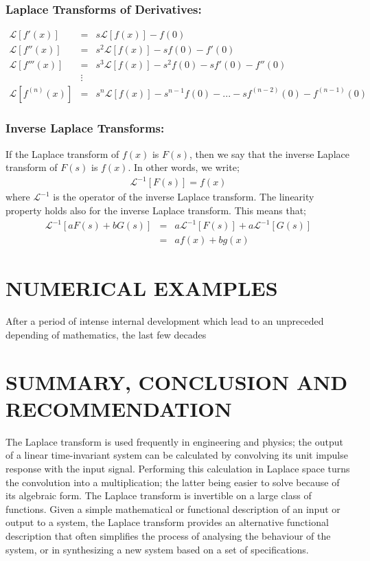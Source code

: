 \documentclass[11pt]{report}
\newcommand{\sps}{\\[0.2cm]}
\begin{document}
	\subsection{Laplace Transforms of Derivatives:}
	\begin{eqnarray*}
		\mathcal{L}[f'(x)] &=& s \mathcal{L}[f(x)] - f(0)\sps
		\mathcal{L}[f''(x)] &=& s^2 \mathcal{L}[f(x)] - sf(0) - f'(0)\sps
		\mathcal{L}[f'''(x)] &=& s^3 \mathcal{L}[f(x)] - s^2f(0) - sf'(0) - f''(0)\sps
		&\vdots\sps
		\mathcal{L}[f^{(n)} (x)] &=& s^n \mathcal{L}[f(x)] - s^{n - 1} f(0) -... - sf^{(n - 2)}(0) - f^{(n - 1)}(0)
	\end{eqnarray*}

	\subsection{Inverse Laplace Transforms:}
	If the Laplace transform of $f(x)$ is $F(s)$, then we say that the inverse Laplace transform of $F(s)$ is $f(x)$. In other words, we write;
	\begin{eqnarray}
		\mathcal{L}^{-1}[F(s)] = f(x)
	\end{eqnarray}
	where $\mathcal{L}^{-1}$ is the operator of the inverse Laplace transform. The linearity property holds also for the inverse Laplace transform. This means that;
	\begin{eqnarray*}
		\mathcal{L}^{-1}[aF(s) + bG(s)] &=& a \mathcal{L}^{-1}[F(s)] +  a \mathcal{L}^{-1}[G(s)]\sps
		&=& af(x) + bg(x)
	\end{eqnarray*}


	\chapter{NUMERICAL EXAMPLES}

	After a period of intense internal development which lead to an unpreceded depending of mathematics, the last few decades 

	\chapter{SUMMARY, CONCLUSION AND RECOMMENDATION}
	The Laplace transform is used frequently in engineering and physics; the output of a linear time-invariant system can be calculated by convolving its unit impulse response with the input signal. Performing this calculation in Laplace space turns the convolution into a multiplication; the latter being easier to solve because of its algebraic form. The Laplace transform is invertible on a large class of functions. Given a simple mathematical or functional description of an input or output to a system, the Laplace transform provides an alternative functional description that often simplifies the process of analysing the behaviour of the system, or in synthesizing a new system based on a set of specifications.\\
	
\end{document}
